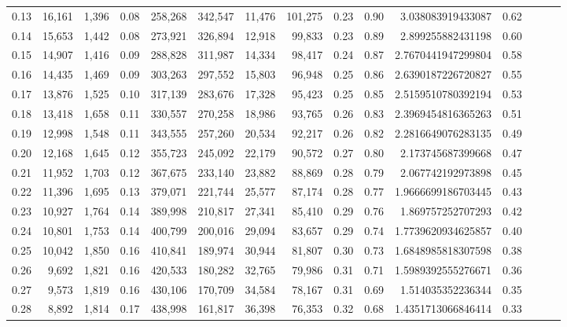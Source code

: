\begin{tabular}{rrrrrrrrrrrrrrr}
0.13 &  16,161 &  1,396 &  0.08 &  258,268 &  342,547 &   11,476 &  101,275 &  0.23 &  0.90 &      3.038083919433087 &      0.62 \\
0.14 &  15,653 &  1,442 &  0.08 &  273,921 &  326,894 &   12,918 &   99,833 &  0.23 &  0.89 &      2.899255882431198 &      0.60 \\
0.15 &  14,907 &  1,416 &  0.09 &  288,828 &  311,987 &   14,334 &   98,417 &  0.24 &  0.87 &     2.7670441947299804 &      0.58 \\
0.16 &  14,435 &  1,469 &  0.09 &  303,263 &  297,552 &   15,803 &   96,948 &  0.25 &  0.86 &     2.6390187226720827 &      0.55 \\
0.17 &  13,876 &  1,525 &  0.10 &  317,139 &  283,676 &   17,328 &   95,423 &  0.25 &  0.85 &     2.5159510780392194 &      0.53 \\
0.18 &  13,418 &  1,658 &  0.11 &  330,557 &  270,258 &   18,986 &   93,765 &  0.26 &  0.83 &     2.3969454816365263 &      0.51 \\
0.19 &  12,998 &  1,548 &  0.11 &  343,555 &  257,260 &   20,534 &   92,217 &  0.26 &  0.82 &     2.2816649076283135 &      0.49 \\
0.20 &  12,168 &  1,645 &  0.12 &  355,723 &  245,092 &   22,179 &   90,572 &  0.27 &  0.80 &      2.173745687399668 &      0.47 \\
0.21 &  11,952 &  1,703 &  0.12 &  367,675 &  233,140 &   23,882 &   88,869 &  0.28 &  0.79 &      2.067742192973898 &      0.45 \\
0.22 &  11,396 &  1,695 &  0.13 &  379,071 &  221,744 &   25,577 &   87,174 &  0.28 &  0.77 &     1.9666699186703445 &      0.43 \\
0.23 &  10,927 &  1,764 &  0.14 &  389,998 &  210,817 &   27,341 &   85,410 &  0.29 &  0.76 &      1.869757252707293 &      0.42 \\
0.24 &  10,801 &  1,753 &  0.14 &  400,799 &  200,016 &   29,094 &   83,657 &  0.29 &  0.74 &     1.7739620934625857 &      0.40 \\
0.25 &  10,042 &  1,850 &  0.16 &  410,841 &  189,974 &   30,944 &   81,807 &  0.30 &  0.73 &     1.6848985818307598 &      0.38 \\
0.26 &   9,692 &  1,821 &  0.16 &  420,533 &  180,282 &   32,765 &   79,986 &  0.31 &  0.71 &     1.5989392555276671 &      0.36 \\
0.27 &   9,573 &  1,819 &  0.16 &  430,106 &  170,709 &   34,584 &   78,167 &  0.31 &  0.69 &      1.514035352236344 &      0.35 \\
0.28 &   8,892 &  1,814 &  0.17 &  438,998 &  161,817 &   36,398 &   76,353 &  0.32 &  0.68 &     1.4351713066846414 &      0.33 \\

\end{tabular}
